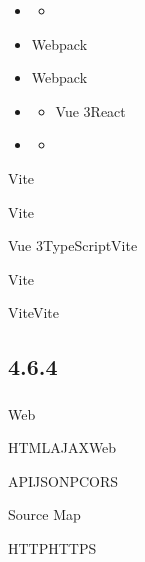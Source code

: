 \important{}


\begin{itemize}
\item
  \begin{itemize}
  \tightlist
  \item
  \end{itemize}
\item
  Webpack
\item
  Webpack
\end{itemize}


\begin{itemize}
\item
  \begin{itemize}
  \tightlist
  \item
    Vue 3React
  \end{itemize}
\item
  \begin{itemize}
  \tightlist
  \item
  \end{itemize}
\end{itemize}

\important{}

Vite

\important{}Vite

\important{}Vue 3TypeScriptVite

\important{}Vite

\important{}ViteVite

\hypertarget{section-39}{%
\subsection{4.6.4}\label{section-39}}

\hypertarget{section-40}{%
\subsubsection{}\label{section-40}}

Web

\important{}

\important{}HTMLAJAXWeb

\important{}APIJSONPCORS

\important{}

\important{}Source Map

\important{}HTTPHTTPS

\important{}

